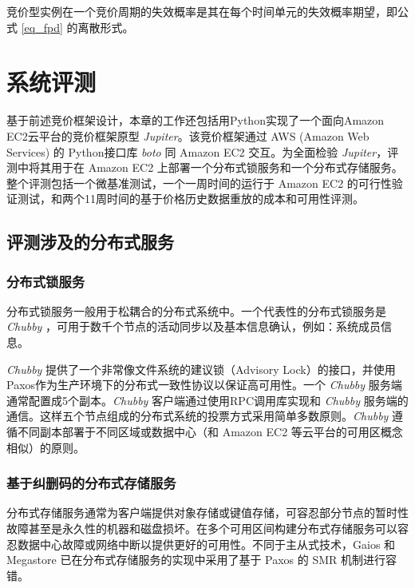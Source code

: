 竞价型实例在一个竞价周期的失效概率是其在每个时间单元的失效概率期望，即公式 \eqref{eq_fpd} 的离散形式。

\section{系统评测}
\label{sec:jupiter-evaluation}
基于前述竞价框架设计，本章的工作还包括用Python实现了一个面向Amazon EC2云平台的竞价框架原型 \emph{Jupiter}。该竞价框架通过 AWS (Amazon Web Services) 的 Python接口库 \emph{boto} \cite{boto:2014} 同 Amazon EC2 交互。为全面检验 \emph{Jupiter}，评测中将其用于在 Amazon EC2 上部署一个分布式锁服务和一个分布式存储服务。整个评测包括一个微基准测试，一个一周时间的运行于 Amazon EC2 的可行性验证测试，和两个11周时间的基于价格历史数据重放的成本和可用性评测。

\subsection{评测涉及的分布式服务}
\label{subsec:jupiter-bc}

\subsubsection{分布式锁服务}
\label{subsection-case-dls}
分布式锁服务一般用于松耦合的分布式系统中。一个代表性的分布式锁服务是 \emph{Chubby} \cite{Burrows:2006:CLS:1298455.1298487}，可用于数千个节点的活动同步以及基本信息确认，例如：系统成员信息。

\emph{Chubby} 提供了一个非常像文件系统的建议锁（Advisory Lock）的接口，并使用Paxos作为生产环境下的分布式一致性协议以保证高可用性。一个 \emph{Chubby} 服务端通常配置成5个副本。\emph{Chubby} 客户端通过使用RPC调用库实现和 \emph{Chubby} 服务端的通信。这样五个节点组成的分布式系统的投票方式采用简单多数原则。\emph{Chubby} 遵循不同副本部署于不同区域或数据中心（和 Amazon EC2 等云平台的可用区概念相似）的原则。

\subsubsection{基于纠删码的分布式存储服务}
\label{subsubsec:dss}
分布式存储服务通常为客户端提供对象存储或键值存储，可容忍部分节点的暂时性故障甚至是永久性的机器和磁盘损坏。在多个可用区间构建分布式存储服务可以容忍数据中心故障或网络中断以提供更好的可用性。不同于主从式技术，Gaios \cite{Bolosky:2011:PRS:1972457.1972472} 和 Megastore \cite{baker2011megastore} 已在分布式存储服务的实现中采用了基于 Paxos 的 SMR 机制进行容错。

